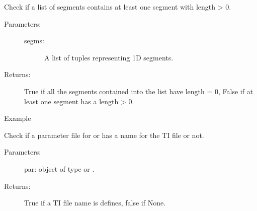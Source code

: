 \documentclass[letterpaper,10pt,english]{sphinxmanual}
\begin{document}
\begin{fulllineitems}
\label{\detokenize{appendices:s2Dcd.s2Dcd.all_segms0}}
Check if a list of segments contains at least one segment with
length \textgreater{} 0.
\begin{description}
\item[{Parameters:}] \leavevmode\begin{description}
\item[{segms:}] \leavevmode
A list of tuples representing 1D segments.

\end{description}

\item[{Returns:}] \leavevmode
True if all the segments contained into the list have length = 0,
False if at least one segment has a length \textgreater{} 0.

\end{description}

Example

\begin{sphinxVerbatim}[commandchars=\\\{\}]
\PYG{p}{[}  \PYG{p}{]}
\PYG{p}{[}  \PYG{p}{]}
\end{sphinxVerbatim}

\end{fulllineitems}


\begin{fulllineitems}
\label{\detokenize{appendices:s2Dcd.s2Dcd.check_ti_file}}
Check if a parameter file for  or  has a name for
the TI file or not.
\begin{description}
\item[{Parameters:}] \leavevmode
par: object of type  or .

\item[{Returns:}] \leavevmode
True if a TI file name is defines, false if None.

\end{description}

\end{fulllineitems}
\end{document}
